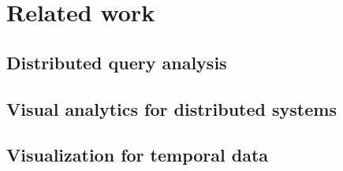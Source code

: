 \section{Related work}
\subsection{Distributed query analysis}
\subsection{Visual analytics for distributed systems}
\subsection{Visualization for temporal data}